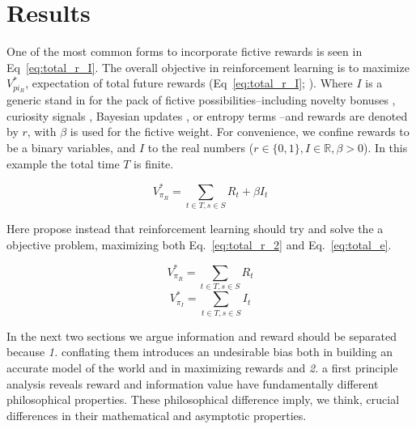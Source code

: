 \documentclass[9pt,twocolumn,twoside]{pnas-new}
\begin{document}


\section*{Results}
One of the most common forms to incorporate fictive rewards is seen in Eq~\ref{eq:total_r_I}. The overall objective in reinforcement learning is to maximize $V^{*}_{pi_R}$, expectation of total future rewards (Eq~\ref{eq:total_r_I}; \cite{Sutton2018}). Where $I$ is a generic stand in for the pack of fictive possibilities--including novelty bonuses \cite{Kakade2002}, curiosity signals \cite{Pathak2017}, Bayesian updates \cite{Radulescu2019}, or entropy terms \cite{Haarnoja2015,Haarnoja2017}--and rewards are denoted by $r$, with $\beta$ is used for the fictive weight. For convenience, we confine rewards to be a binary variables, and $I$ to the real numbers ($r \in \{0, 1\}, I \in \mathbb{R}, \beta > 0$). In this example the total time $T$ is finite.

\begin{equation}
    V^{*}_{\pi_R} = \sum_{t \in T, s \in S} R_t + \beta I_t
    \label{eq:total_r_I}
\end{equation}

Here propose instead that reinforcement learning should try and solve the a objective problem, maximizing both Eq.~\ref{eq:total_r_2} and Eq.~\ref{eq:total_e}. 

\begin{multicols}{2}
  \begin{equation}
    V^{*}_{\pi_R} = \sum_{t \in T, s \in S} R_t
    \label{eq:total_r_2}
  \end{equation}\break
  \begin{equation}
    V^{*}_{\pi_I} = \sum_{t \in T, s \in S} I_t
    \label{eq:total_e}
  \end{equation}
\end{multicols}

In the next two sections we argue information and reward should be separated because \textit{1.} conflating them introduces an undesirable bias both in building an accurate model of the world and in maximizing rewards and \textit{2.} a first principle analysis reveals reward and information value have fundamentally different philosophical properties. These philosophical difference imply, we think, crucial differences in their mathematical and asymptotic properties.
\end{document}
